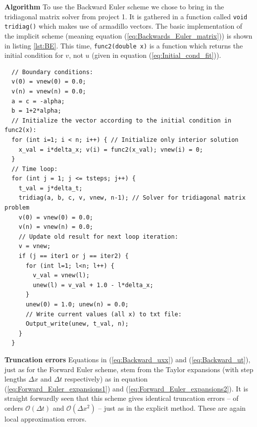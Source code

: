 \documentclass[a4paper, 11pt, notitlepage,english]{article}
\begin{document}
\textbf{Algorithm} \newline
To use the Backward Euler scheme we chose to bring in the tridiagonal matrix solver from project 1. It is gathered in a function called \texttt{void tridiag()} which makes use of armadillo vectors. The basic implementation of the implicit scheme (meaning equation (\ref{eq:Backwards_Euler_matrix})) is shown in listing \ref{lst:BE}. This time, \texttt{func2(double x)} is a function which returns the initial condition for $v$, not $u$ (given in equation (\ref{eq:Initial_cond_fit})). \newpage

\begin{center}
\begin{lstlisting}
  // Boundary conditions:
  v(0) = vnew(0) = 0.0;
  v(n) = vnew(n) = 0.0;
  a = c = -alpha; 
  b = 1+2*alpha; 
  // Initialize the vector according to the initial condition in func2(x):
  for (int i=1; i < n; i++) { // Initialize only interior solution
    x_val = i*delta_x; v(i) = func2(x_val); vnew(i) = 0;
  }
  // Time loop:
  for (int j = 1; j <= tsteps; j++) {
    t_val = j*delta_t;
    tridiag(a, b, c, v, vnew, n-1); // Solver for tridiagonal matrix problem
    v(0) = vnew(0) = 0.0;
    v(n) = vnew(n) = 0.0;
    // Update old result for next loop iteration:
    v = vnew;
    if (j == iter1 or j == iter2) {
      for (int l=1; l<n; l++) {
        v_val = vnew(l);
        unew(l) = v_val + 1.0 - l*delta_x;
      }
      unew(0) = 1.0; unew(n) = 0.0;
      // Write current values (all x) to txt file:
      Output_write(unew, t_val, n);
    }
  }
\end{lstlisting}
\end{center}

\textbf{Truncation errors} \newline
Equations in (\ref{eq:Backward_uxx}) and (\ref{eq:Backward_ut}), just as for the Forward Euler scheme, stem from the Taylor expansions (with step lengths $\Delta x$ and $\Delta t$ respectively) as in equation (\ref{eq:Forward_Euler_expansions1}) and (\ref{eq:Forward_Euler_expansions2}). It is straight forwardly seen that this scheme gives identical truncation errors – of orders $\mathcal{O}(\Delta t)$ and $\mathcal{O}(\Delta x^2)$ – just as in the explicit method. These are again local approximation errors. \\
\end{document}
